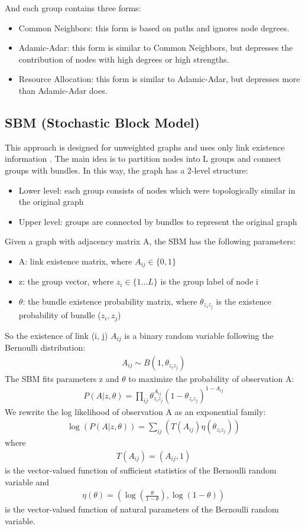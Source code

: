 \documentclass[11pt,twocolumn]{article}
\begin{document}
And each group contains three forms:
\begin{itemize}
	\item Common Neighbors: this form is based on paths and ignores node degrees.
	\item Adamic-Adar: this form is similar to Common Neighbors,
	but depresses the contribution of nodes with high degrees or high strengths.
	\item Resource Allocation: this form is similar to Adamic-Adar,
	but depresses more than Adamic-Adar does.
\end{itemize}

\subsection{SBM (Stochastic Block Model)}
This approach is designed for unweighted graphs and uses only link existence information \cite{holland1983stochastic}.
The main idea is to partition nodes into L groups and connect groups with bundles.
In this way, the graph has a 2-level structure:
\begin{itemize}
	\item Lower level: each group consists of nodes which were topologically similar in the original graph
	\item Upper level: groups are connected by bundles
	to represent the original graph
\end{itemize}
Given a graph with adjacency matrix A, the SBM has the following parameters:
\begin{itemize}
	\item A: link existence matrix, where $ A_{ij} \in \{0, 1\} $
	\item z: the group vector,
	where $ z_i \in \{ 1 ... L \} $ is the group label of node i
	\item $ \theta $: the bundle existence probability matrix,
	where $ \theta_{z_i z_j} $ is the existence probability of bundle ($z_i, z_j$)
\end{itemize}
So the existence of link (i, j) $ A_{ij} $ is a binary random variable following the Bernoulli distribution:
\begin{align*}
	A_{ij} \sim B(1, \theta_{z_i z_j})
\end{align*}
The SBM fits parameters z and $ \theta $
to maximize the probability of observation A:
\begin{align*}
	P(A|z, \theta) 
	= \prod_{ij} \theta_{z_i z_j}^{A_{ij}}(1-\theta_{z_i z_j})^{1-A_{ij}}
\end{align*}
We rewrite the log likelihood of observation A as an exponential family:
\begin{align*}
	\log(P(A|z, \theta))
	= \sum_{ij} (
	T(A_{ij}) \eta(\theta_{z_i z_j})
	)
\end{align*}
where
\begin{align*}
	T(A_{ij}) = (A_{ij}, 1)
\end{align*}
is the vector-valued function of sufficient statistics of the Bernoulli random variable and
\begin{align*}
\eta(\theta) = ( \log(\frac{\theta}{1-\theta}), \log(1-\theta) )
\end{align*}
is the vector-valued function of natural parameters of the Bernoulli random variable.
\end{document}
